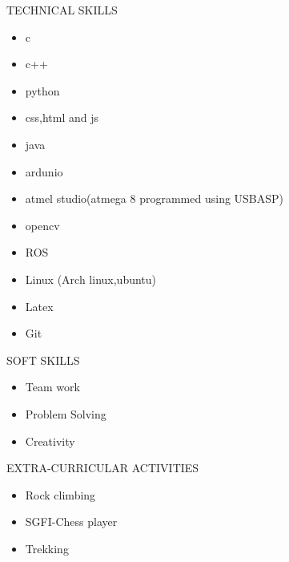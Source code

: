 \documentclass[10pt]{article}
\begin{document}
		
	\begin{minipage}[t][4cm][t]{0.2\textwidth}
		TECHNICAL SKILLS
		
	\end{minipage}
	\begin{minipage}[t][4cm][t]{0.8\textwidth}
		\begin{itemize}
			\item c
			\item c++
			\item python
			\item css,html and js
			\item java
			\item ardunio
			\item atmel studio(atmega 8 programmed using USBASP)
			\item opencv
			\item ROS
			\item Linux (Arch linux,ubuntu)
			\item Latex
			\item Git
		\end{itemize}
		
	\end{minipage}




		
	\begin{minipage}[t][2cm][t]{0.2\textwidth}
		SOFT SKILLS
		
	\end{minipage}
	\begin{minipage}[t][2cm][t]{0.8\textwidth}
		\begin{itemize}
			\item Team work
			\item Problem Solving
			\item Creativity
		\end{itemize}
		
	\end{minipage}



		
	\begin{minipage}[t][2cm][t]{0.2\textwidth}
		EXTRA-CURRICULAR ACTIVITIES
		
	\end{minipage}
	\begin{minipage}[t][2cm][t]{0.8\textwidth}
	\begin{itemize}
		\item Rock climbing
		\item SGFI-Chess player
		\item Trekking
	\end{itemize}
		
	\end{minipage}
\end{document}
